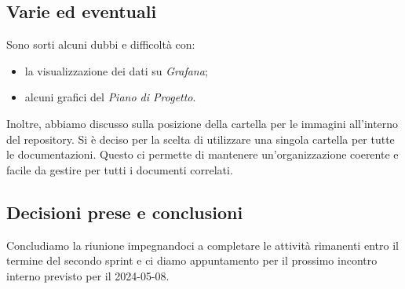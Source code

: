 \documentclass[italian,12pt]{article}
\begin{document}
\subsection{Varie ed eventuali}
Sono sorti alcuni dubbi e difficoltà con:
\begin{itemize}
	\item la visualizzazione dei dati su \textit{Grafana};
	\item alcuni grafici del \textit{Piano di Progetto}.
\end{itemize}
Inoltre, abbiamo discusso sulla posizione della cartella per le immagini all'interno del repository. Si è deciso per la scelta di utilizzare una singola cartella per tutte le documentazioni. Questo ci permette di mantenere un'organizzazione coerente e facile da gestire per tutti i documenti correlati.

\subsection{Decisioni prese e conclusioni}
Concludiamo la riunione impegnandoci a completare le attività rimanenti entro il termine del secondo sprint e ci diamo appuntamento per il prossimo incontro interno previsto per il 2024-05-08.
\end{document}
